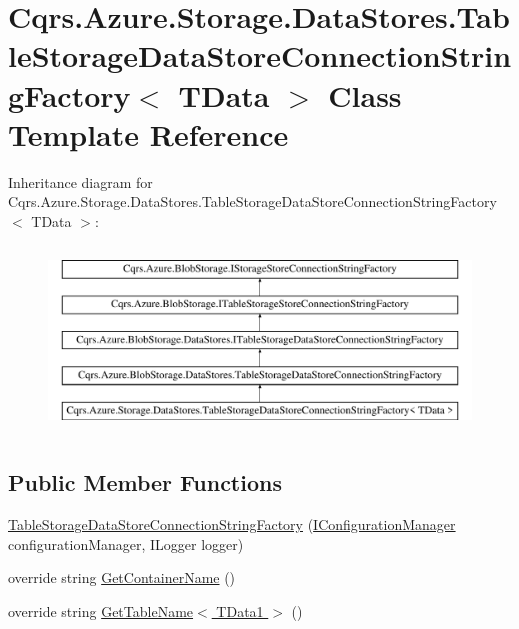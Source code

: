 \hypertarget{classCqrs_1_1Azure_1_1Storage_1_1DataStores_1_1TableStorageDataStoreConnectionStringFactory}{}\section{Cqrs.\+Azure.\+Storage.\+Data\+Stores.\+Table\+Storage\+Data\+Store\+Connection\+String\+Factory$<$ T\+Data $>$ Class Template Reference}
\label{classCqrs_1_1Azure_1_1Storage_1_1DataStores_1_1TableStorageDataStoreConnectionStringFactory}
Inheritance diagram for Cqrs.\+Azure.\+Storage.\+Data\+Stores.\+Table\+Storage\+Data\+Store\+Connection\+String\+Factory$<$ T\+Data $>$\+:\begin{figure}[H]
\begin{center}
\leavevmode
\includegraphics[height=5.000000cm]{classCqrs_1_1Azure_1_1Storage_1_1DataStores_1_1TableStorageDataStoreConnectionStringFactory}
\end{center}
\end{figure}
\subsection*{Public Member Functions}
\begin{DoxyCompactItemize}
\item 
\hyperlink{classCqrs_1_1Azure_1_1Storage_1_1DataStores_1_1TableStorageDataStoreConnectionStringFactory_a72218c0219be3c3185ae98893f0d91e3_a72218c0219be3c3185ae98893f0d91e3}{Table\+Storage\+Data\+Store\+Connection\+String\+Factory} (\hyperlink{interfaceCqrs_1_1Configuration_1_1IConfigurationManager}{I\+Configuration\+Manager} configuration\+Manager, I\+Logger logger)
\item 
override string \hyperlink{classCqrs_1_1Azure_1_1Storage_1_1DataStores_1_1TableStorageDataStoreConnectionStringFactory_aa31a217ca659f298016bd8ecabe98387_aa31a217ca659f298016bd8ecabe98387}{Get\+Container\+Name} ()
\item 
override string \hyperlink{classCqrs_1_1Azure_1_1Storage_1_1DataStores_1_1TableStorageDataStoreConnectionStringFactory_a386df8c514b08c9c39583ea9e9a9abe6_a386df8c514b08c9c39583ea9e9a9abe6}{Get\+Table\+Name$<$ T\+Data1 $>$} ()
\end{DoxyCompactItemize}
